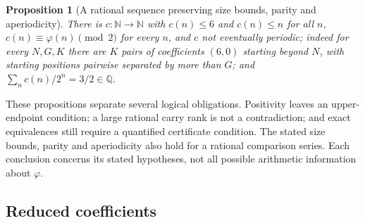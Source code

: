 \documentclass[11pt]{article}
\theoremstyle{plain}
\newtheorem{prop}[thm]{Proposition}
\theoremstyle{definition}
\theoremstyle{remark}
\newcommand{\N}{\mathbb{N}}
\newcommand{\Q}{\mathbb{Q}}
\begin{document}
\begin{prop}[A rational sequence preserving size bounds, parity and aperiodicity]
\label{prop:parity}
There is $c : \N \to \N$ with $c(n) \le 6$ and $c(n) \le n$ for all $n$,
$c(n) \equiv \varphi(n) \pmod 2$ for \emph{every} $n$, and $c$ not eventually
periodic; indeed for every $N, G, K$ there are $K$ pairs of coefficients
$(6,0)$ starting beyond $N$, with starting positions pairwise separated
by more than $G$; and
$\sum_n c(n)/2^{n} = 3/2 \in \Q$.
\end{prop}

These propositions separate several logical obligations. Positivity leaves
an upper-endpoint condition; a large rational carry rank is not a contradiction;
and exact equivalences still require a quantified certificate condition. The stated size
bounds, parity and aperiodicity also hold for a rational comparison series. Each
conclusion concerns its stated hypotheses, not all possible arithmetic
information about $\varphi$.

\subsection{Reduced coefficients}\label{sub:reduced-coefficients}
\end{document}
